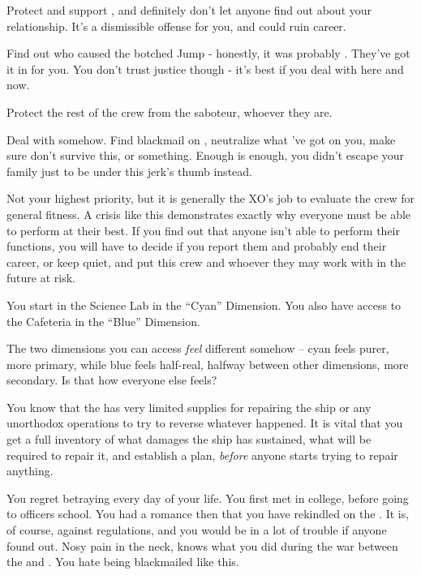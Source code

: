 \documentclass[char]{TMFHope}
\begin{document}
\begin{itemz}[Goals]
	\item Protect and support \cSci{}, and definitely don't let anyone find out about your relationship. It's a dismissible offense for you, and could ruin \cSci{\their} career.
	\item Find out who caused the botched Jump - honestly, it was probably \cDip{}. They've got it in for you. You don't trust \pPlan{} justice though - it's best if you deal with \cDip{\them} here and now.
	\item Protect the rest of the crew from the saboteur, whoever they are.
	\item Deal with \cDip{} somehow. Find blackmail on \cDip{\them}, neutralize what \cDip{\they}'ve got on you, make sure \cDip{\they} don't survive this, or something. Enough is enough, you didn't escape your family just to be under this jerk's thumb instead.
	\item Not your highest priority, but it is generally the XO's job to evaluate the crew for general fitness. A crisis like this demonstrates exactly why everyone must be able to perform at their best. If you find out that anyone isn't able to perform their functions, you will have to decide if you report them and probably end their career, or keep quiet, and put this crew and whoever they may work with in the future at risk.
\end{itemz}

\begin{itemz}[Notes]
	\item You start in the Science Lab in the ``Cyan'' Dimension. You also have access to the Cafeteria in the ``Blue'' Dimension. 
	\item The two dimensions you can access {\em feel} different somehow -- cyan feels purer, more primary, while blue feels half-real, halfway between other dimensions, more secondary.  Is that how everyone else feels?
	\item You know that the \pNew{} has very limited supplies for repairing the ship or any unorthodox operations to try to reverse whatever happened. It is vital that you get a full inventory of what damages the ship has sustained, what will be required to repair it, and establish a plan, \emph{before} anyone starts trying to repair anything.
\end{itemz}

\begin{contacts}
	\contact{\cCap{}} You regret betraying \cCap{} every day of your life.
	\contact{\cSci{}} You first met \cSci{} in college, before going to officers school. You had a romance then that you have rekindled on the \pNew{}. It is, of course, against regulations, and you would be in a lot of trouble if anyone found out.
	\contact{\cDip{}} Nosy pain in the neck, \cDip{} knows what you did during the war between the \pPlan{} and \pEdge{}. You hate being blackmailed like this.
\end{contacts}
\end{document}
